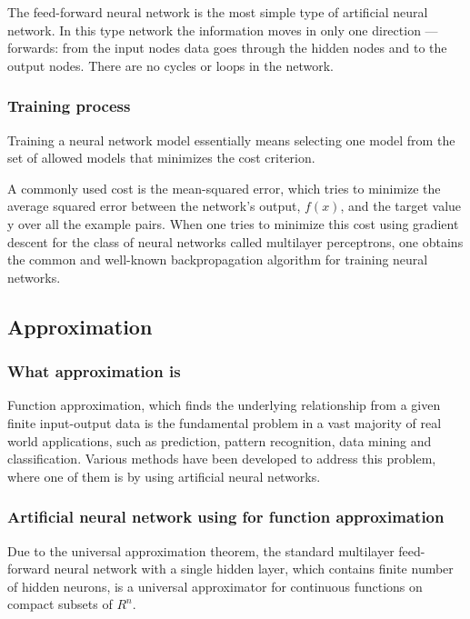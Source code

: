 \documentclass[a4paper,12pt]{article}
\begin{document}

The feed-forward neural network is the most simple type of artificial neural network. In this type network the information moves in only one direction — forwards: from the input nodes data goes through the hidden nodes and to the output nodes. There are no cycles or loops in the network.

\subsubsection{Training process}

Training a neural network model essentially means selecting one model from the set of allowed models that minimizes the cost criterion.

A commonly used cost is the mean-squared error, which tries to minimize the average squared error between the network's output, $f(x)$, and the target value y over all the example pairs. When one tries to minimize this cost using gradient descent for the class of neural networks called multilayer perceptrons, one obtains the common and well-known backpropagation algorithm for training neural networks.

\subsection{Approximation}
\subsubsection{What approximation is}

Function approximation, which finds the underlying relationship from a given finite input-output data is the fundamental problem in a vast majority of real world applications, such as prediction, pattern recognition, data mining and classification. Various methods have been developed to address this problem, where one of them is by using artificial neural networks.

\subsubsection{Artificial neural network using for function approximation}

Due to the universal approximation theorem, the standard multilayer feed-forward neural network with a single hidden layer, which contains finite number of hidden neurons, is a universal approximator for continuous functions on compact subsets of $R^n$.
\end{document}
